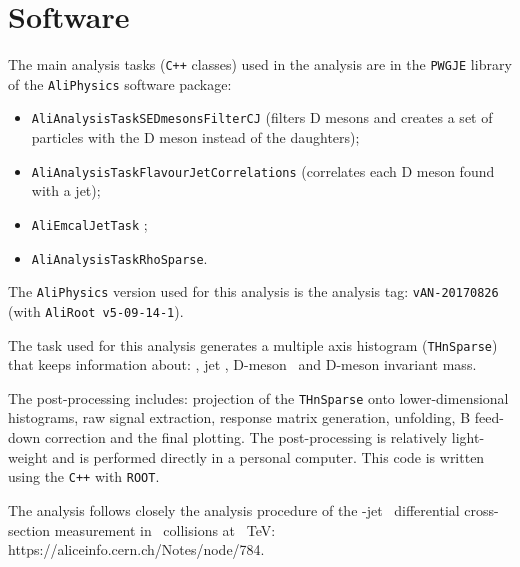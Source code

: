\section{Software}

The main analysis tasks (\texttt{C++} classes) used in the analysis are in the \texttt{PWGJE} library of the \texttt{AliPhysics} software package:
\begin{itemize}
\item \texttt{AliAnalysisTaskSEDmesonsFilterCJ} (filters D mesons and creates a set of particles with the D meson instead of the daughters);
\item \texttt{AliAnalysisTaskFlavourJetCorrelations} (correlates each D meson found with a jet);
\item \texttt{AliEmcalJetTask} ;%
\item \texttt{AliAnalysisTaskRhoSparse}. %
\end{itemize}
The \texttt{AliPhysics} version used for this analysis is the analysis tag: \texttt{vAN-20170826} (with \texttt{AliRoot v5-09-14-1}).%

The task used for this analysis generates a multiple axis histogram (\texttt{THnSparse}) that keeps information about: \zpar, jet \pt, D-meson \pt\ and D-meson invariant mass.

The post-processing includes: projection of the \texttt{THnSparse} onto lower-dimensional histograms, raw signal extraction, response matrix generation, unfolding, B feed-down correction and the final plotting.
The post-processing is relatively light-weight and is performed directly in a personal computer. This code is written using the \texttt{C++} with \texttt{ROOT}.

The analysis follows closely the analysis procedure of the \Dzero-jet \pt\ differential cross-section measurement in \pPb\ collisions at ~TeV: https://aliceinfo.cern.ch/Notes/node/784.

%


